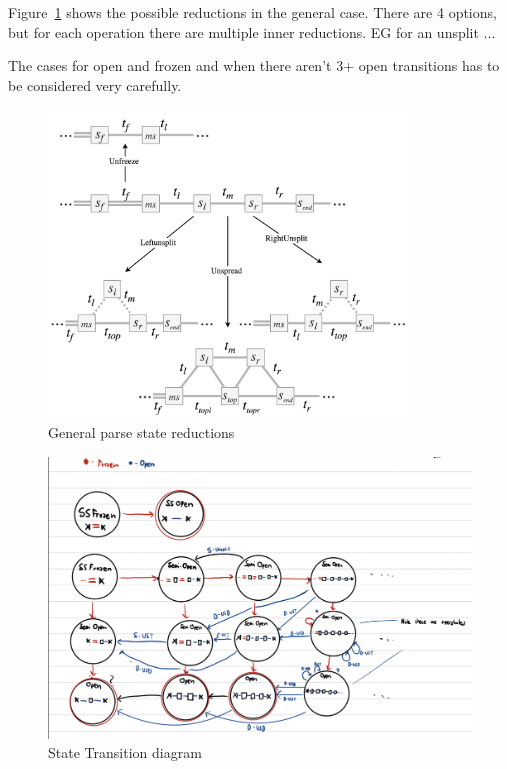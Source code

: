 \documentclass[12pt,a4paper,twoside,openright]{report}
\theoremstyle{definition}
\begin{document}
Figure~\ref{fig:parseStateOptions} shows the possible reductions in the general case. There are 4 options, but for each operation there are multiple inner reductions. EG for an unsplit ... 

The cases for open and frozen and when there aren't 3+ open transitions has to be considered very carefully.

\begin{figure}[h]
  \centering
  \includegraphics[width=0.85\textwidth]{impl/parseOps}
  \caption{General parse state reductions}
  \label{fig:parseStateOptions}
\end{figure}

\begin{figure}[h]
  \centering
  \includegraphics[width=\textwidth]{statetransitions}
  \caption{State Transition diagram}
  \label{fig:statetrans}
\end{figure}
\end{document}
